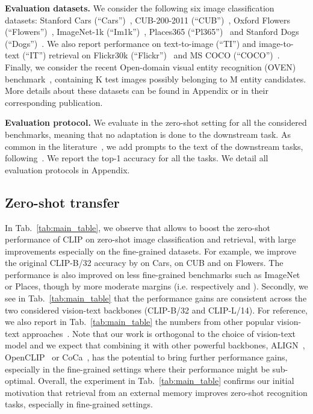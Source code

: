 \vspace{-0.1cm}
\noindent\textbf{Evaluation datasets.}
We consider the following six image classification datasets:
Stanford Cars (``Cars'')~\cite{krause20133d},
CUB-200-2011 (``CUB'')~\cite{wah2011caltech},
Oxford Flowers (``Flowers'')~\cite{nilsback2008automated},
ImageNet-1k (``Im1k'')~\cite{russakovsky2015imagenet},
Places365 (``Pl365'')~\cite{zhou2017places} and
Stanford Dogs (``Dogs'')~\cite{KhoslaYaoJayadevaprakashFeiFei_FGVC2011}.
We also report performance on text-to-image (``TI'') and image-to-text (``IT'') retrieval on Flickr30k (``Flickr'')~\cite{plummer2015flickr30k} and MS COCO (``COCO'')~\cite{lin2014microsoft}.
Finally, we consider the recent Open-domain visual entity recognition (OVEN) benchmark~\cite{hu2023open}, containing K test images possibly belonging to M entity candidates.
More details about these datasets can be found in Appendix or in their corresponding publication.

\vspace{-0.1cm}
\noindent\textbf{Evaluation protocol.}
We evaluate in the zero-shot setting for all the considered benchmarks, meaning that no adaptation is done to the downstream task.
As common in the literature~\cite{radford2021learning,jia2021scaling,singh2022flava,zhai2022lit}, we add prompts to the text of the downstream tasks, following~\cite{zhai2022lit}.
We report the top-1 accuracy for all the tasks.
We detail all evaluation protocols in Appendix.

\vspace{-0.2cm}
\subsection{Zero-shot transfer}
\vspace{-0.2cm}
In Tab.~\ref{tab:main_table}, we observe that \OURS allows to boost the zero-shot performance of CLIP on zero-shot image classification and retrieval, with large improvements especially on the fine-grained datasets.
For example, we improve the original CLIP-B/32 accuracy by  on Cars,   on CUB and  on Flowers.
The performance is also improved on less fine-grained benchmarks such as ImageNet or Places, though by more moderate margins (i.e. respectively  and ).
Secondly, we see in Tab.~\ref{tab:main_table} that the performance gains are consistent across the two considered vision-text backbones (CLIP-B/32 and CLIP-L/14).
For reference, we also report in Tab.~\ref{tab:main_table} the numbers from other popular vision-text approaches~\cite{singh2022flava,jia2021scaling,zhai2022lit,pali2022}.
Note that our work is orthogonal to the choice of vision-text model and we expect that combining it with other powerful backbones, \eg ALIGN~\cite{jia2021scaling}, OpenCLIP~\cite{cherti2022reproducible} or CoCa~\cite{yu2022coca}, has the potential to bring further performance gains, especially in the fine-grained settings where their performance might be sub-optimal.
Overall, the experiment in Tab.~\ref{tab:main_table} confirms our initial motivation that retrieval from an external memory improves zero-shot recognition tasks, especially in fine-grained settings.

